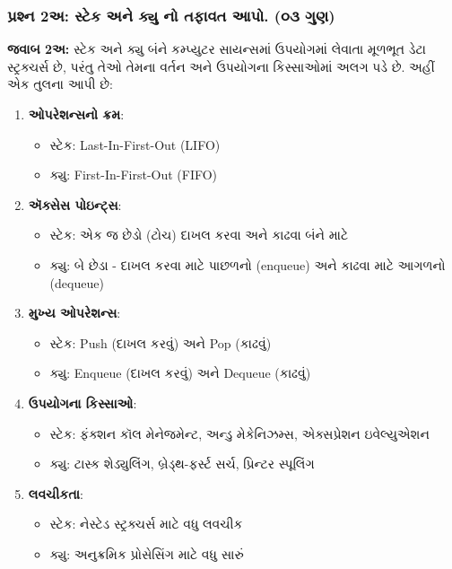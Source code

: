 \hypertarget{uxaaauxab0uxab6uxaa8-2uxa85-uxab8uxa9fuxa95-uxa85uxaa8-uxa95uxaaf-uxaa8-uxaa4uxaabuxab5uxaa4-uxa86uxaaa.-uxae6uxae9-uxa97uxaa3}{%
\subsubsection{પ્રશ્ન 2અ: સ્ટેક અને ક્યુ નો તફાવત આપો. (૦૩
ગુણ)}\label{uxaaauxab0uxab6uxaa8-2uxa85-uxab8uxa9fuxa95-uxa85uxaa8-uxa95uxaaf-uxaa8-uxaa4uxaabuxab5uxaa4-uxa86uxaaa.-uxae6uxae9-uxa97uxaa3}}

\textbf{જવાબ 2અ:} સ્ટેક અને ક્યુ બંને કમ્પ્યુટર સાયન્સમાં ઉપયોગમાં લેવાતા મૂળભૂત ડેટા
સ્ટ્રક્ચર્સ છે, પરંતુ તેઓ તેમના વર્તન અને ઉપયોગના કિસ્સાઓમાં અલગ પડે છે. અહીં એક તુલના
આપી છે:

\begin{enumerate}
\def\labelenumi{\arabic{enumi}.}
\tightlist
\item
  \textbf{ઓપરેશન્સનો ક્રમ}:

  \begin{itemize}
  \tightlist
  \item
    સ્ટેક: Last-In-First-Out (LIFO)
  \item
    ક્યુ: First-In-First-Out (FIFO)
  \end{itemize}
\item
  \textbf{ઍક્સેસ પોઇન્ટ્સ}:

  \begin{itemize}
  \tightlist
  \item
    સ્ટેક: એક જ છેડો (ટોચ) દાખલ કરવા અને કાઢવા બંને માટે
  \item
    ક્યુ: બે છેડા - દાખલ કરવા માટે પાછળનો (enqueue) અને કાઢવા માટે આગળનો
    (dequeue)
  \end{itemize}
\item
  \textbf{મુખ્ય ઓપરેશન્સ}:

  \begin{itemize}
  \tightlist
  \item
    સ્ટેક: Push (દાખલ કરવું) અને Pop (કાઢવું)
  \item
    ક્યુ: Enqueue (દાખલ કરવું) અને Dequeue (કાઢવું)
  \end{itemize}
\item
  \textbf{ઉપયોગના કિસ્સાઓ}:

  \begin{itemize}
  \tightlist
  \item
    સ્ટેક: ફંક્શન કૉલ મેનેજમેન્ટ, અન્ડુ મેકેનિઝમ્સ, એક્સપ્રેશન ઇવેલ્યુએશન
  \item
    ક્યુ: ટાસ્ક શેડ્યુલિંગ, બ્રેડ્થ-ફર્સ્ટ સર્ચ, પ્રિન્ટર સ્પૂલિંગ
  \end{itemize}
\item
  \textbf{લવચીકતા}:

  \begin{itemize}
  \tightlist
  \item
    સ્ટેક: નેસ્ટેડ સ્ટ્રક્ચર્સ માટે વધુ લવચીક
  \item
    ક્યુ: અનુક્રમિક પ્રોસેસિંગ માટે વધુ સારું
  \end{itemize}
\end{enumerate}

